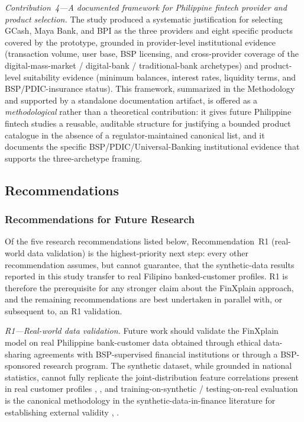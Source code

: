 \documentclass{icsthesis}
\begin{document}
\begin{mainmatter}
				\textit{Contribution~4---A documented framework for Philippine fintech provider and product selection.} The study produced a systematic justification for selecting GCash, Maya Bank, and BPI as the three providers and eight specific products covered by the prototype, grounded in provider-level institutional evidence (transaction volume, user base, BSP licensing, and cross-provider coverage of the digital-mass-market / digital-bank / traditional-bank archetypes) and product-level suitability evidence (minimum balances, interest rates, liquidity terms, and BSP/PDIC-insurance status). This framework, summarized in the Methodology and supported by a standalone documentation artifact, is offered as a \emph{methodological} rather than a theoretical contribution: it gives future Philippine fintech studies a reusable, auditable structure for justifying a bounded product catalogue in the absence of a regulator-maintained canonical list, and it documents the specific BSP/PDIC/Universal-Banking institutional evidence that supports the three-archetype framing.

			\subsection{Recommendations}
				\subsubsection{Recommendations for Future Research}
					Of the five research recommendations listed below, Recommendation~R1 (real-world data validation) is the highest-priority next step: every other recommendation assumes, but cannot guarantee, that the synthetic-data results reported in this study transfer to real Filipino banked-customer profiles. R1 is therefore the prerequisite for any stronger claim about the FinXplain approach, and the remaining recommendations are best undertaken in parallel with, or subsequent to, an R1 validation.

					\textit{R1---Real-world data validation.} Future work should validate the FinXplain model on real Philippine bank-customer data obtained through ethical data-sharing agreements with BSP-supervised financial institutions or through a BSP-sponsored research program. The synthetic dataset, while grounded in national statistics, cannot fully replicate the joint-distribution feature correlations present in real customer profiles \cite{ref29}, \cite{ref34}, and training-on-synthetic / testing-on-real evaluation is the canonical methodology in the synthetic-data-in-finance literature for establishing external validity \cite{ref46}, \cite{ref83}. 


\end{mainmatter}
\end{document}
